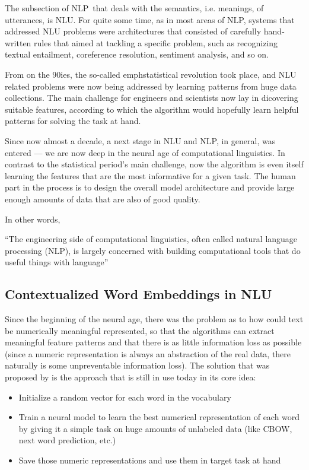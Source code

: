 The subsection of NLP that deals with the semantics, i.e. meanings, of utterances, is NLU.
For quite some time, as in most areas of NLP, systems that addressed NLU problems were
architectures that consisted of carefully hand-written rules that aimed at tackling a specific
problem, such as recognizing textual entailment, coreference resolution, sentiment analysis,
and so on.

From on the 90ies, the so-called emph{statistical revolution} took place, and NLU related
problems were now being addressed by learning patterns from huge data collections.  The main
challenge for engineers and scientists now lay in dicovering suitable features, according to
which the algorithm would hopefully learn helpful patterns for solving the task at hand.

Since now almost a decade, a next stage in NLU and NLP, in general, was entered --- we are
now deep in the neural age of computational linguistics.  In contrast to the statistical
period's main challenge, now the algorithm is even itself learning the features that are the
most informative for a given task.  The human part in the process is to design the overall
model architecture and provide large enough amounts of data that are also of good quality.

In other words,

``The engineering side of computational linguistics, often called natural language processing
(NLP), is largely concerned with building computational tools that do useful things with
language'' \cite{johnson2009statistical}

\subsection{Contextualized Word Embeddings in NLU}

Since the beginning of the neural age, there was the problem as to how could text be numerically
meaningful represented, so that the algorithms can extract meaningful feature patterns and
that there is as little information loss as possible (since a numeric representation is always
an abstraction of the real data, there naturally is some unpreventable information loss).
The solution that was proposed by \cite{mikolov2013distributed} is the approach that is still
in use today in its core idea:

\begin{itemize}
	\item Initialize a random vector for each word in the vocabulary
	\item Train a neural model to learn the best numerical representation of each word
		by giving it a simple task on huge amounts of unlabeled data (like CBOW, next word
		prediction, etc.)
	\item Save those numeric representations and use them in target task at hand
\end{itemize}


